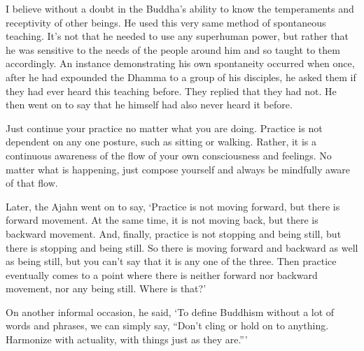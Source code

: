 I believe without a doubt in the Buddha's ability to know the temperaments and receptivity of other beings. He used this very same method of spontaneous teaching. It's not that he needed to use any superhuman power, but rather that he was sensitive to the needs of the people around him and so taught to them accordingly. An instance demonstrating his own spontaneity occurred when once, after he had expounded the Dhamma to a group of his disciples, he asked them if they had ever heard this teaching before. They replied that they had not. He then went on to say that he himself had also never heard it before.

Just continue your practice no matter what you are doing. Practice is not dependent on any one posture, such as sitting or walking. Rather, it is a continuous awareness of the flow of your own consciousness and feelings. No matter what is happening, just compose yourself and always be mindfully aware of that flow.

Later, the Ajahn went on to say, `Practice is not moving forward, but there is forward movement. At the same time, it is not moving back, but there is backward movement. And, finally, practice is not stopping and being still, but there is stopping and being still. So there is moving forward and backward as well as being still, but you can't say that it is any one of the three. Then practice eventually comes to a point where there is neither forward nor backward movement, nor any being still. Where is that?'

On another informal occasion, he said, `To define Buddhism without a lot of words and phrases, we can simply say, ``Don't cling or hold on to anything. Harmonize with actuality, with things just as they are.''\thinspace'
